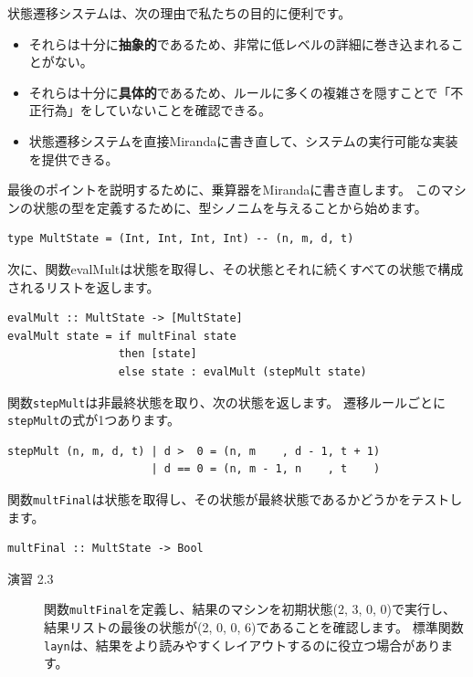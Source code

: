 \documentclass{jbook}
\begin{document}
状態遷移システムは、次の理由で私たちの目的に便利です。

\begin{itemize}
	\item それらは十分に\textbf{抽象的}であるため、非常に低レベルの詳細に巻き込まれることがない。
	\item それらは十分に\textbf{具体的}であるため、ルールに多くの複雑さを隠すことで「不正行為」をしていないことを確認できる。
	\item 状態遷移システムを直接Mirandaに書き直して、システムの実行可能な実装を提供できる。
\end{itemize}

最後のポイントを説明するために、乗算器をMirandaに書き直します。
このマシンの状態の型を定義するために、型シノニムを与えることから始めます。

\begin{verbatim}
type MultState = (Int, Int, Int, Int) -- (n, m, d, t)
\end{verbatim}

次に、関数evalMultは状態を取得し、その状態とそれに続くすべての状態で構成されるリストを返します。

\begin{verbatim}
evalMult :: MultState -> [MultState]
evalMult state = if multFinal state
                 then [state]
                 else state : evalMult (stepMult state)
\end{verbatim}

関数\texttt{stepMult}は非最終状態を取り、次の状態を返します。
遷移ルールごとに\texttt{stepMult}の式が1つあります。

\begin{verbatim}
stepMult (n, m, d, t) | d >  0 = (n, m    , d - 1, t + 1)
                      | d == 0 = (n, m - 1, n    , t    )
\end{verbatim}

関数\texttt{multFinal}は状態を取得し、その状態が最終状態であるかどうかをテストします。

\begin{verbatim}
multFinal :: MultState -> Bool
\end{verbatim}

\begin{description}
	\item[演習 2.3] 関数\texttt{multFinal}を定義し、結果のマシンを初期状態(2, 3, 0, 0)で実行し、結果リストの最後の状態が(2, 0, 0, 6)であることを確認します。
		標準関数\texttt{layn}は、結果をより読みやすくレイアウトするのに役立つ場合があります。
\end{description}
\end{document}
